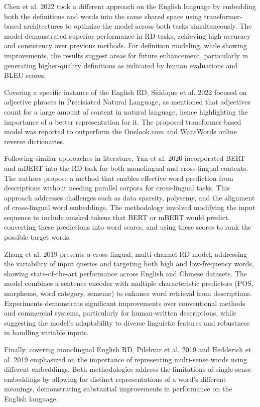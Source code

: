 \documentclass[12pt]{article}
\begin{document}
Chen et al. 2022 \cite{Chen2022} took a different approach on the English language by embedding both the definitions and words into the same shared space using transformer-based architectures to optimize the model across both tasks simultaneously. The model demonstrated superior performance in RD tasks, achieving high accuracy and consistency over previous methods. For definition modeling, while showing improvements, the results suggest areas for future enhancement, particularly in generating higher-quality definitions as indicated by human evaluations and BLEU scores.

Covering a specific instance of the English RD, Siddique et al. 2022 \cite{Siddique2022} focused on adjective phrases in Precisiated Natural Language, as mentioned that adjectives count for a large amount of content in natural language, hence highlighting the importance of a better representation for it. The proposed transformer-based model was reported to outperform the Onelook.com and WantWords online reverse dictionaries.

Following similar approaches in literature, Yan et al. 2020 \cite{Yan2020} incorporated BERT and mBERT into the RD task for both monolingual and cross-lingual contexts. The authors propose a method that enables effective word prediction from descriptions without needing parallel corpora for cross-lingual tasks. This approach addresses challenges such as data sparsity, polysemy, and the alignment of cross-lingual word embeddings. The methodology involved modifying the input sequence to include masked tokens that BERT or mBERT would predict, converting these predictions into word scores, and using these scores to rank the possible target words.

Zhang et al. 2019 \cite{Zhang2019} presents a cross-lingual, multi-channel RD model, addressing the variability of input queries and targeting both high and low-frequency words, showing state-of-the-art performance across English and Chinese datasets. The model combines a sentence encoder with multiple characteristic predictors (POS, morpheme, word category, sememe) to enhance word retrieval from descriptions. Experiments demonstrate significant improvements over conventional methods and commercial systems, particularly for human-written descriptions, while suggesting the model's adaptability to diverse linguistic features and robustness in handling variable inputs.

Finally, covering monolingual English RD, Pilehvar et al. 2019 \cite{Pilehvar2019} and Hedderich et al. 2019 \cite{Hedderich2019} emphasized on the importance of representing multi-sense words using different embeddings. Both methodologies address the limitations of single-sense embeddings by allowing for distinct representations of a word's different meanings, demonstrating substantial improvements in performance on the English language.
\end{document}
